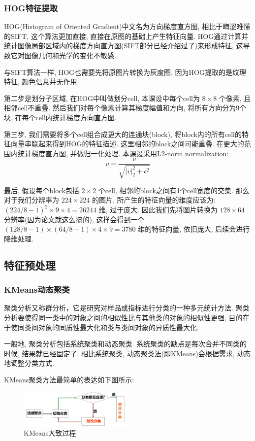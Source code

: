 \documentclass[lang=cn,12pt,a4paper]{elegantpaper}
\begin{document}
\subsubsection{HOG特征提取}
HOG(Histogram of Oriented Gradient)中文名为方向梯度直方图, 相比于晦涩难懂的SIFT, 这个算法更加直接, 直接在原图的基础上产生特征向量. HOG通过计算并统计图像局部区域内的梯度方向直方图(SIFT部分已经介绍过了)来形成特征, 这导致它对图像几何和光学的变化不敏感.

与SIFT算法一样, HOG也需要先将原图片转换为灰度图, 因为HOG提取的是纹理特征, 颜色信息并无作用.

第二步是划分子区域, 在HOG中叫做划分cell, 本课设中每个cell为 $8 \times 8$ 个像素, 且相邻cell不重叠. 然后我们对每个像素计算其梯度幅值和方向, 将所有方向分为9个块, 在每个cell内统计梯度方向直方图.

第三步, 我们需要将多个cell组合成更大的连通块(block), 将block内的所有cell的特征向量串联起来得到HOG的特征描述. 这里相邻的block之间可能重叠. 在更大的范围内统计梯度直方图, 并做归一化处理. 本课设采用L2-norm normalization:
\begin{equation*}
    v = \frac{v}{\sqrt{|v|^2_2+\epsilon^2}}
\end{equation*}

最后, 假设每个block包括 $2 \times 2$ 个cell, 相邻的block之间有1个cell宽度的交集. 那么对于我们分辨率为 $224 \times 224$ 的图片, 所产生的特征向量的维度应该为: $(224/8-1)^2\times9\times4=26244$ 维, 过于庞大. 因此我们先将图片转换为 $128 \times 64$ 分辨率(因为论文就这么搞的), 这样会得到一个 $(128/8-1)\times(64/8-1)\times4\times9=3780$ 维的特征向量, 依旧庞大, 后续会进行降维处理.

\subsection{特征预处理}
\subsubsection{KMeans动态聚类}
聚类分析又称群分析，它是研究对样品或指标进行分类的一种多元统计方法. 聚类分析要使得同一类中的对象之间的相似性比与其他类的对象的相似性更强, 目的在于使同类间对象的同质性最大化和类与类间对象的异质性最大化.

一般地, 聚类分析包括系统聚类和动态聚类. 系统聚类的缺点是每次合并不同类的时候, 结果就已经固定了. 相比系统聚类, 动态聚类法(即KMeans)会根据需求, 动态地调整分类方式.

KMeans聚类方法最简单的表达如下图所示:

\begin{figure}[h]
    \centering
    \includegraphics[width=0.5\textwidth]{lateximgs/2.png}
    \caption{KMeans大致过程}
\end{figure}
\end{document}
